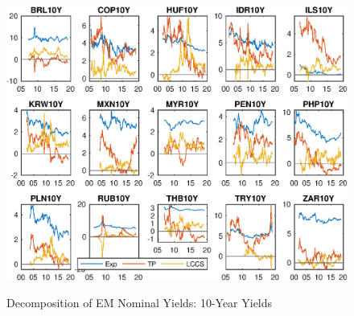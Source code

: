 \documentclass{article}
\begin{document}
\begin{figure}[tbph]
	\begin{center}
		\caption{Decomposition of EM Nominal Yields: 10-Year Yields}
		\label{fig:ny_dcmp}
		\includegraphics[trim={0cm 0cm 0cm 0cm},clip,height=1\textheight,width=1.4\textwidth]{../Figures/Estimation/ny_dcmp.eps} \\
	\end{center}
\end{figure}
\end{document}
